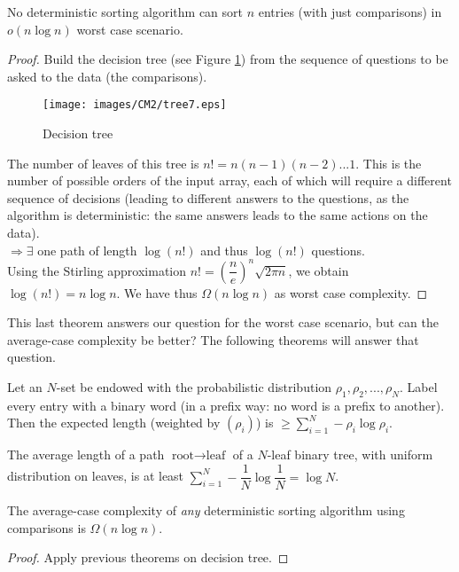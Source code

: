 \begin{theorem}
No deterministic sorting algorithm can sort $n$ entries (with just comparisons) in $o(n\log n)$ worst case scenario.
\end{theorem}
\begin{proof}
Build the decision tree (see Figure \ref{tree7}) from the sequence of questions to be asked to the data (the comparisons).
\begin{figure}[htbp]
\centering
\texttt{[image: images/CM2/tree7.eps]}
\caption{Decision tree}
\label{tree7}
\end{figure}
The number of leaves of this tree is $n! = n(n-1)(n-2)...1$. This is the number of possible orders of the input array, each of which will require a different sequence of decisions (leading to different answers to the questions, as the algorithm is deterministic: the same answers leads to the same actions on the data). \\

$\Rightarrow \exists$ one path of length $\log (n!)$ and thus $\log(n!)$ questions. \\

Using the Stirling approximation $n! = \left( \dfrac{n}{e} \right)^n \sqrt{2\pi n}$, we obtain $\log (n!) = n \log n$. We have thus $\Omega (n \log n)$ as worst case complexity.

\end{proof}

This last theorem answers our question for the worst case scenario, but can the average-case complexity be better? The following theorems will answer that question.\\

\begin{theorem}[Shannon 1948]
Let an $N$-set be endowed with the probabilistic distribution $\rho_1, \rho_2,..., \rho_N$. Label every entry with a binary word (in a prefix way: no word is a prefix to another). Then the expected length (weighted by $(\rho_i)$) is $\geq \sum_{i=1}^{N} -\rho_i \log \rho_i$. 
\end{theorem}
\begin{theorem}
The average length of a path $\text{root} \rightarrow \text{leaf}$ of a $N$-leaf binary tree, with uniform distribution on leaves, is at least $\sum_{i=1}^N -\dfrac{1}{N} \log \dfrac{1}{N} = \log N$.
\end{theorem}
\begin{theorem}
The average-case complexity of \emph{any} deterministic sorting algorithm using comparisons is $\Omega (n\log n)$.
\end{theorem}
\begin{proof}
Apply previous theorems on decision tree.

\end{proof}

